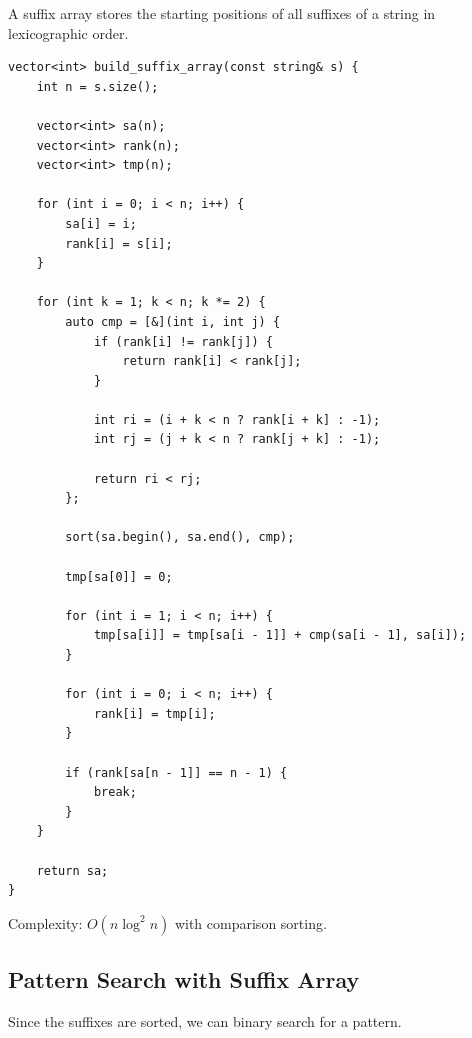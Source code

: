 \documentclass[11pt]{article}
\begin{document}
A suffix array stores the starting positions of all suffixes of a string in
lexicographic order.

\begin{lstlisting}
vector<int> build_suffix_array(const string& s) {
    int n = s.size();

    vector<int> sa(n);
    vector<int> rank(n);
    vector<int> tmp(n);

    for (int i = 0; i < n; i++) {
        sa[i] = i;
        rank[i] = s[i];
    }

    for (int k = 1; k < n; k *= 2) {
        auto cmp = [&](int i, int j) {
            if (rank[i] != rank[j]) {
                return rank[i] < rank[j];
            }

            int ri = (i + k < n ? rank[i + k] : -1);
            int rj = (j + k < n ? rank[j + k] : -1);

            return ri < rj;
        };

        sort(sa.begin(), sa.end(), cmp);

        tmp[sa[0]] = 0;

        for (int i = 1; i < n; i++) {
            tmp[sa[i]] = tmp[sa[i - 1]] + cmp(sa[i - 1], sa[i]);
        }

        for (int i = 0; i < n; i++) {
            rank[i] = tmp[i];
        }

        if (rank[sa[n - 1]] == n - 1) {
            break;
        }
    }

    return sa;
}
\end{lstlisting}

Complexity: $O(n \log^2 n)$ with comparison sorting.

\subsection{Pattern Search with Suffix Array}

Since the suffixes are sorted, we can binary search for a pattern.
\end{document}
